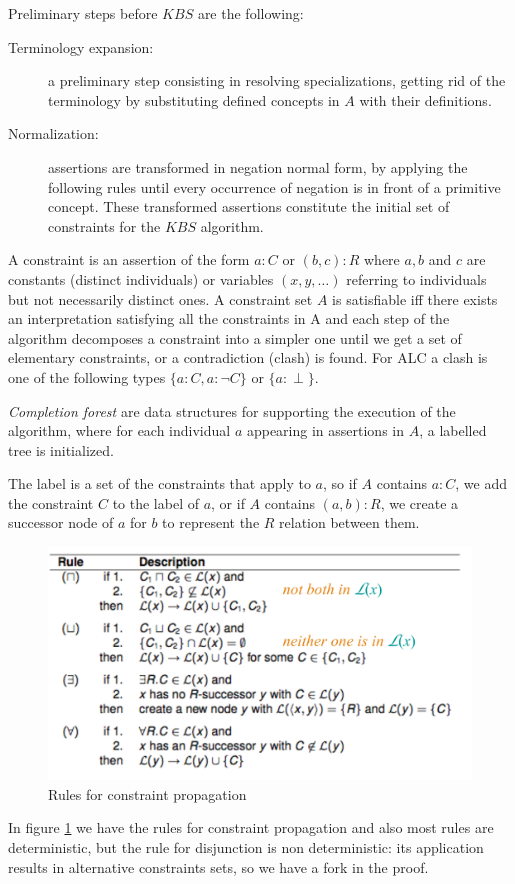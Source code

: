 Preliminary steps before $KBS$ are the following:
\begin{description}
   \item [Terminology expansion: ] a preliminary step consisting in resolving 
	   specializations, getting rid of the terminology by substituting defined
           concepts in $A$ with their definitions.
   \item [Normalization: ] assertions are transformed in negation normal form,
	   by applying the following rules until every occurrence of
           negation is in front of a primitive concept.\newline
	   These transformed assertions constitute the initial set of constraints
	   for the $KBS$ algorithm.
\end{description}
A constraint is an assertion of the form $a:C$ or $(b, c):R$ where $a,b$ and $c$ are
constants (distinct individuals) or variables $(x, y, \dots)$ referring to individuals but
not necessarily distinct ones.\newline
A constraint set $A$ is satisfiable iff there exists an interpretation satisfying all the
constraints in A and each step of the algorithm decomposes a constraint into a simpler one
until we get a set of elementary constraints, or a contradiction (clash) is found.\newline
For ALC a clash is one of the following types $\{a:C, a:\neg C\}$ or $\{a: \perp\}$.

\emph{Completion forest} are data structures for supporting the execution of the algorithm,
where for each individual $a$ appearing in assertions in $A$, a labelled tree is initialized.

The label is a set of the constraints that apply to $a$, so if $A$ contains $a:C$,
we add the constraint $C$ to the label of $a$, or if $A$ contains $(a, b):R$,
we create a successor node of $a$ for $b$ to represent the $R$ relation between them.

\begin{figure}
	\includegraphics[width=\textwidth]{Images/rulesPropagation}
	\caption{Rules for constraint propagation}
	\label{img:rulesPropagation}
\end{figure}
In figure \ref{img:rulesPropagation} we have the rules for constraint propagation and also
most rules are deterministic, but the rule for disjunction is non deterministic: 
its application results in alternative constraints sets, so we have a fork in the proof.

